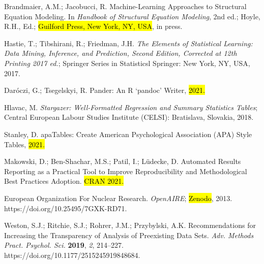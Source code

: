\documentclass[psych,tutorial,accept,moreauthors,pdftex]{Definitions/mdpi}
\begin{document}
\begin{thebibliography}{999}
Brandmaier, A.M.; Jacobucci, R. Machine-Learning Approaches to Structural Equation Modeling. In \emph{Handbook of Structural Equation Modeling}, 2nd ed.; Hoyle, R.H., Ed.; \hl{Guilford Press, New York, NY, USA}, in press.%


Hastie, T.; Tibshirani, R.; Friedman, J.H. \emph{The Elements of Statistical Learning: Data Mining, Inference, and Prediction, Second Edition, Corrected at 12th Printing 2017 ed.}; Springer Series in Statisticsl Springer: New York, NY, USA, 2017.


Daróczi, G.; Tsegelskyi, R. Pander: An R ‘pandoc’ Writer, \hl{2021.}%


Hlavac, M. \emph{Stargazer: Well-Formatted Regression and Summary Statistics Tables}; Central European Labour Studies Institute (CELSI): Bratislava, Slovakia, 2018.


Stanley, D. apaTables: Create American Psychological Association (APA) Style Tables, \hl{2021.}%

Makowski, D.; Ben-Shachar, M.S.; Patil, I.; Lüdecke, D. Automated Results Reporting as a Practical Tool to Improve Reproducibility and Methodological Best Practices Adoption. \hl{CRAN 2021.}%

European Organization For Nuclear Research. \emph{OpenAIRE}; \hl{Zenodo}, 2013. https://doi.org/10.25495/7GXK-RD71.%

Weston, S.J.; Ritchie, S.J.; Rohrer, J.M.; Przybylski, A.K. Recommendations for Increasing the Transparency of Analysis of Preexisting Data Sets. \emph{Adv. Methods Pract. Psychol. Sci.} \textbf{2019}, \emph{2}, 214--227. https://doi.org/10.1177/2515245919848684.



\end{thebibliography}
\end{document}

